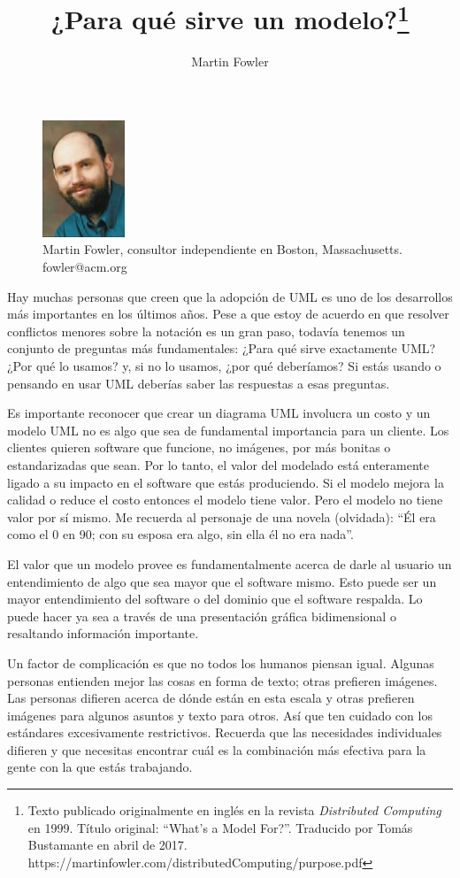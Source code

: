\documentclass[twocolumn]{article}
\title{\Huge \textbf{¿Para qué sirve un modelo?}\thanks{Texto publicado originalmente en inglés en la revista \textit{Distributed Computing} en 1999. Título original: \textquotedblleft What's a Model For?\textquotedblright{}. Traducido por Tomás Bustamante en abril de 2017.
\newline https://martinfowler.com/distributedComputing/purpose.pdf}}
\author{Martin Fowler}
\date{}
\begin{document}
\maketitle

\begin{figure}
\centering
\includegraphics[width=0.22\textwidth]{fowler.png}
{\caption*{Martin Fowler, consultor independiente en Boston, Massachusetts. fowler@acm.org}}
\end{figure}

Hay muchas personas que creen que la adopción de UML es uno de los desarrollos más importantes en los últimos años. Pese a que estoy de acuerdo en que resolver conflictos menores sobre la notación es un gran paso, todavía tenemos un conjunto de preguntas más fundamentales: ¿Para qué sirve exactamente UML? ¿Por qué lo usamos? y, si no lo usamos, ¿por qué deberíamos? Si estás usando o pensando en usar UML deberías saber las respuestas a esas preguntas.

Es importante reconocer que crear un diagrama UML involucra un costo y un modelo UML no es algo que sea de fundamental importancia para un cliente. Los clientes quieren software que funcione, no imágenes, por más bonitas o estandarizadas que sean. Por lo tanto, el valor del modelado está enteramente ligado a su impacto en el software que estás produciendo. Si el modelo mejora la calidad o reduce el costo entonces el modelo tiene valor. Pero el modelo no tiene valor por sí mismo. Me recuerda al personaje de una novela (olvidada): \textquotedblleft Él era como el 0 en 90; con su esposa era algo, sin ella él no era nada\textquotedblright .

El valor que un modelo provee es fundamentalmente acerca de darle al usuario un entendimiento de algo que sea mayor que el software mismo. Esto puede ser un mayor entendimiento del software o del dominio que el software respalda. Lo puede hacer ya sea a través de una presentación gráfica bidimensional o resaltando información importante.

Un factor de complicación es que no todos los humanos piensan igual. Algunas personas entienden mejor las cosas en forma de texto; otras prefieren imágenes. Las personas difieren acerca de dónde están en esta escala y otras prefieren imágenes para algunos asuntos y texto para otros. Así que ten cuidado con los estándares excesivamente restrictivos. Recuerda que las necesidades individuales difieren y que necesitas encontrar cuál es la combinación más efectiva para la gente con la que estás trabajando.
\end{document}
